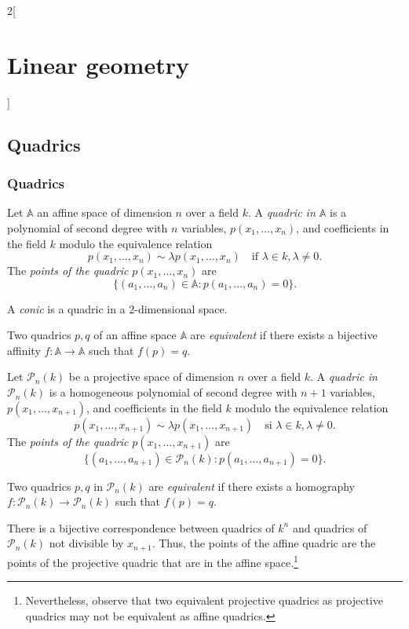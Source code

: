 \documentclass[class=article,10pt,crop=false]{standalone}
\begin{document}
\begin{multicols}{2}[\section{Linear geometry}]
\subsection{Quadrics}
\subsubsection{Quadrics}
\begin{definition}
Let $\mathbb{A}$ an affine space of dimension $n$ over a field $k$. A \textit{quadric in $\mathbb{A}$} is a polynomial of second degree with $n$ variables, $p(x_1,\ldots,x_n)$, and coefficients in the field $k$ modulo the equivalence relation $$p(x_1,\ldots,x_n)\sim\lambda p(x_1,\ldots,x_n)\quad\text{if }\lambda\in k,\lambda\ne0.$$ The \textit{points of the quadric} $p(x_1,\ldots,x_n)$ are $$\{(a_1,\ldots,a_n)\in\mathbb{A}:p(a_1,\ldots,a_n)=0\}.$$
\end{definition}
\begin{definition}
A \textit{conic} is a quadric in a 2-dimensional space.
\end{definition}
\begin{definition}
Two quadrics $p,q$ of an affine space $\mathbb{A}$ are \textit{equivalent} if there exists a bijective affinity $f:\mathbb{A}\rightarrow\mathbb{A}$ such that $f(p)=q$.
\end{definition}
\begin{definition}
Let $\mathcal{P}_n(k)$ be a projective space of dimension $n$ over a field $k$. A \textit{quadric in $\mathcal{P}_n(k)$} is a homogeneous polynomial of second degree with $n+1$ variables, $p(x_1,\ldots,x_{n+1})$, and coefficients in the field $k$ modulo the equivalence relation $$p(x_1,\ldots,x_{n+1})\sim\lambda p(x_1,\ldots,x_{n+1})\quad\text{si }\lambda\in k,\lambda\ne0.$$ The \textit{points of the quadric} $p(x_1,\ldots,x_{n+1})$ are $$\{(a_1,\ldots,a_{n+1})\in\mathcal{P}_n(k):p(a_1,\ldots,a_{n+1})=0\}.$$
\end{definition}
\begin{definition}
Two quadrics $p,q$ in $\mathcal{P}_n(k)$ are \textit{equivalent} if there exists a homography $f:\mathcal{P}_n(k)\rightarrow\mathcal{P}_n(k)$ such that $f(p)=q$.
\end{definition}
\begin{theorem}
There is a bijective correspondence between quadrics of $k^n$ and quadrics of $\mathcal{P}_n(k)$ not divisible by $x_{n+1}$. Thus, the points of the affine quadric are the points of the projective quadric that are in the affine space.\footnote{Nevertheless, observe that two equivalent projective quadrics as projective quadrics may not be equivalent as affine quadrics.}

\end{theorem}
\end{multicols}
\end{document}
